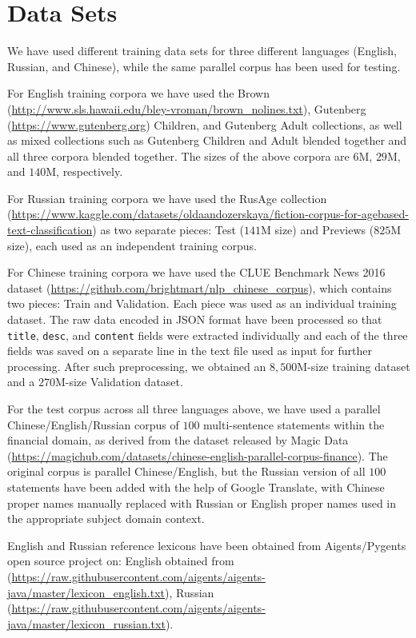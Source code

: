 \documentclass[11pt]{article}
\begin{document}
\section{\label{data}Data Sets}

We have used different training data sets for three different languages (English, Russian, and Chinese), while the same parallel corpus has been used for testing.

For English training corpora we have used the Brown (\url{http://www.sls.hawaii.edu/bley-vroman/brown_nolines.txt}), Gutenberg (\url{https://www.gutenberg.org}) Children, and Gutenberg Adult collections, as well as mixed collections such as Gutenberg Children and Adult blended together and all three corpora blended together. The sizes of the above corpora are $6$M, $29$M, and $140$M, respectively. 

For Russian training corpora we have used the RusAge collection (\url{https://www.kaggle.com/datasets/oldaandozerskaya/fiction-corpus-for-agebased-text-classification}) as two separate pieces: Test ($141$M size) and Previews ($825$M size), each used as an independent training corpus.

For Chinese training corpora we have used the CLUE Benchmark News 2016 dataset (\url{https://github.com/brightmart/nlp_chinese_corpus}), which contains two pieces: Train and Validation. Each piece was used as an individual training dataset. The raw data encoded in JSON format have been processed so that \texttt{title}, \texttt{desc}, and \texttt{content} fields were extracted individually and each of the three fields was saved on a separate line in the text file used as input for further processing. After such preprocessing, we obtained an $8,500$M-size training dataset and a $270$M-size Validation dataset. 

For the test corpus across all three languages above, we have used a parallel Chinese/English/Russian corpus of $100$ multi-sentence statements within the financial domain, as derived from the dataset released by Magic Data (\url{https://magichub.com/datasets/chinese-english-parallel-corpus-finance}). The original corpus is parallel Chinese/English, but the Russian version of all $100$ statements have been added with the help of Google Translate, with Chinese proper names manually replaced with Russian or English proper names used in the appropriate subject domain context.

English and Russian reference lexicons have been obtained from Aigents/Pygents open source project on: English obtained from (\url{https://raw.githubusercontent.com/aigents/aigents-java/master/lexicon_english.txt}), Russian (\url{https://raw.githubusercontent.com/aigents/aigents-java/master/lexicon_russian.txt}).
\end{document}

